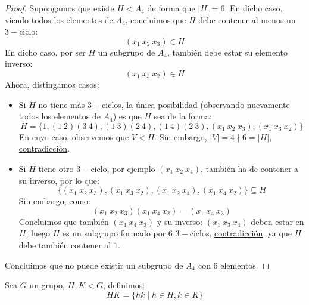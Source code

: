 \begin{ejemplo}
    \begin{proof}
        Supongamos que existe $H < A_4$ de forma que $|H| = 6$. En dicho caso, viendo todos los elementos de $A_4$, concluimos que $H$ debe contener al menos un $3-$ciclo: 
        \begin{equation*}
            (x_1\ x_2\ x_3) \in  H
        \end{equation*}
        En dicho caso, por ser $H$ un subgrupo de $A_4$, también debe estar su elemento inverso:
        \begin{equation*}
            (x_1\ x_3\ x_2) \in H
        \end{equation*}
        Ahora, distingamos casos:
        \begin{itemize}
            \item Si $H$ no tiene más $3-$ciclos, la única posibilidad (observando nuevamente todos los elementos de $A_4$) es que $H$ sea de la forma:
                \begin{equation*}
                    H = \{1, (1\ 2)(3\ 4), (1\ 3)(2\ 4), (1\ 4)(2\ 3), (x_1\ x_2\ x_3), (x_1\ x_3\ x_2)\}
                \end{equation*}
                En cuyo caso, observemos que $V < H$. Sin embargo, $|V| = 4 \nmid 6 = |H|$, \underline{contradicción}.
            \item Si $H$ tiene otro $3-$ciclo, por ejemplo $(x_1\ x_2\ x_4)$, también ha de contener a su inverso, por lo que:
                \begin{equation*}
                    \{(x_1\ x_2\ x_3), (x_1\ x_3\ x_2), (x_1\ x_2\ x_4), (x_1\ x_4\ x_2)\} \subseteq H
                \end{equation*}
                Sin embargo, como:
                \begin{equation*}
                    (x_1\ x_2\ x_3)(x_1\ x_4\ x_2) = (x_1\ x_4\ x_3)
                \end{equation*}
                Concluimos que también $(x_1\ x_4\ x_3)$ y su inverso: $(x_1\ x_3\ x_4)$ deben estar en $H$, luego $H$ es un subgrupo formado por 6 $3-$ciclos, \underline{contradicción}, ya que $H$ debe también contener al 1.
        \end{itemize}
        Concluimos que no puede existir un subgrupo de $A_4$ con 6 elementos.
    \end{proof}
\end{ejemplo}

\begin{definicion}
    Sea $G$ un grupo, $H, K < G$, definimos:
    \begin{equation*}
        HK = \{hk \mid h\in H, k \in K\}
    \end{equation*}
\end{definicion}

